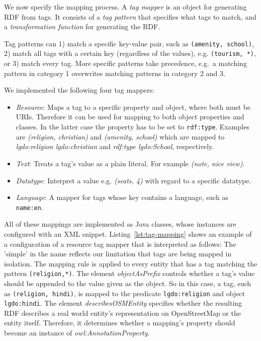 We now specify the mapping process.
A \emph{tag mapper} is an object for generating RDF from tags.
It consists of a \emph{tag pattern} that specifies what tags to match,
and a \emph{transformation function} for generating the RDF.

Tag patterns can 1) match a specific key-value pair, such as \texttt{(amenity, school)}, 2) match all tags with a certain key (regardless of the values), e.g. \texttt{(tourism, *)}, or 3) match every tag. 
More specific patterns take precedence, e.g.~a matching pattern in category 1 overwrites matching patterns in category 2 and 3.

We implemented the following four tag mappers:
\begin{itemize}
  \item \emph{Resource}: Maps a tag to a specific property and
  object, where both must be URIs. Therefore it can be used for mapping to
  both object properties and classes. In the latter case the property
  has to be set to \texttt{rdf:type}.
  Examples are \emph{(religion, christian)} and \emph{(amenity, school)} which
  are mapped to \emph{lgdo:religion lgdo:christian} and
  \emph{rdf:type lgdo:School}, respectively.
  \item \emph{Text}: Treats a tag's value as a plain literal. For example
  \emph{(note, nice view)}.
  \item \emph{Datatype}: Interpret a value e.g. \emph{(seats, 4)} with regard
  to a specific datatype.
  \item \emph{Language}: A mapper for tags whose key contains a
  language, such as \texttt{name:en}.
\end{itemize}

All of these mappings are implemented as Java classes, whose instances are
configured with an XML snippet. Listing~\ref{lst:tag-mapping} shows an example
of a configuration of a resource tag mapper that is interpreted as
follows: The 'simple' in the name reflects our limitation that tags are being
mapped in isolation. The mapping rule is applied to every entity that has a tag
matching the pattern \texttt{(religion,*)}.  The element \emph{objectAsPrefix} 
controls whether a tag's value should be appended to the value given as the object.
So in this case, a tag, such as \texttt{(religion, hindi)}, is mapped to the
predicate \texttt{lgdo:religion} and object \texttt{lgdo:hindi}.
The element \emph{describesOSMEntity} specifies whether the resulting RDF
describes a real world entity's representation on OpenStreetMap or the entity
itself. Therefore, it determines whether a mapping's property
should become an instance of \emph{owl:AnnotationProperty}.


